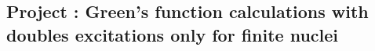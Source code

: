 \documentclass[%
twoside,                 %
final,                   %
10pt]{article}
\newenvironment{doconceexercise}{}{}
\newcounter{doconceexercisecounter}
\begin{document}
\begin{doconceexercise}

\subsection*{Project \thedoconceexercisecounter: Green's function calculations with doubles excitations only for finite nuclei}


\end{doconceexercise}




\printindex
\end{document}
